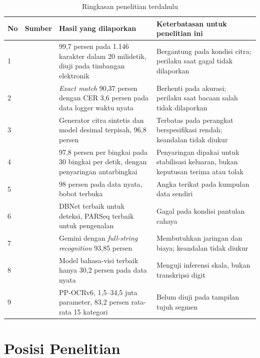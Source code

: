 \begin{table}[H]
\caption{Ringkasan penelitian terdahulu}
\label{tab:terdahulu}
\begin{tabularx}{\textwidth}{@{}p{0.6cm} p{3.3cm} p{4.6cm} X@{}}
\toprule
\textbf{No} & \textbf{Sumber} & \textbf{Hasil yang dilaporkan} & \textbf{Keterbatasan untuk penelitian ini} \\
\midrule
1 & \textcite{jiang2026method} & 99,7 persen pada 1.146 karakter dalam 20 milidetik, diuji pada timbangan elektronik & Bergantung pada kondisi citra; perilaku saat gagal tidak dilaporkan \\
2 & \textcite{effendi2025unjuk} & \textit{Exact match} 90,37 persen dengan CER 3,6 persen pada data logger waktu nyata & Berhenti pada akurasi; perilaku saat bacaan salah tidak dilaporkan \\
3 & \textcite{gushima2023automatic} & Generator citra sintetis dan model desimal terpisah, 96,8 persen & Terbatas pada perangkat berspesifikasi rendah; keandalan tidak diukur \\
4 & \textcite{yenneti2023lightweight} & 97,8 persen per bingkai pada 30 bingkai per detik, dengan penyaringan antarbingkai & Penyaringan dipakai untuk stabilisasi keluaran, bukan keputusan terima atau tolak \\
5 & \textcite{oicws2026lcd} & 98 persen pada data nyata, bobot terbuka & Angka terikat pada kumpulan data sendiri \\
6 & \textcite{low2024detecting} & DBNet terbaik untuk deteksi, PARSeq terbaik untuk pengenalan & Gagal pada kondisi pantulan cahaya \\
7 & \textcite{ega2026leveraging} & Gemini dengan \textit{full-string recognition} 93,85 persen & Membutuhkan jaringan dan biaya; keandalan tidak diukur \\
8 & \textcite{lin2026measurebench} & Model bahasa-visi terbaik hanya 30,2 persen pada data nyata & Menguji inferensi skala, bukan transkripsi digit \\
9 & \textcite{zhang2026ppocrv6} & PP-OCRv6, 1,5--34,5 juta parameter, 83,2 persen rata-rata 15 kategori & Belum diuji pada tampilan tujuh segmen \\
\bottomrule
\end{tabularx}
\end{table}

\section{Posisi Penelitian}

